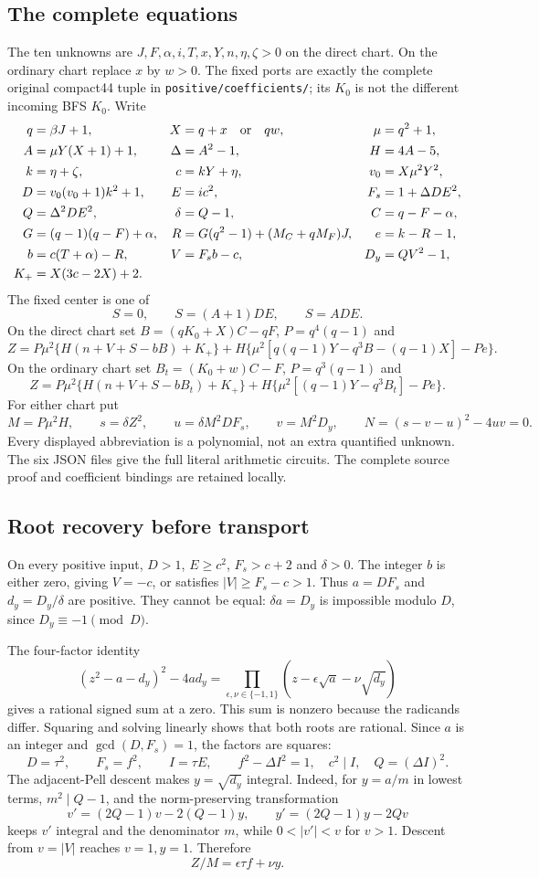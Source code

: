 \subsection{The complete equations}
The ten unknowns are $J,F,\alpha,i,T,x,Y,n,\eta,\zeta>0$ on the direct chart. On the ordinary chart replace $x$ by $w>0$. The fixed ports are exactly the complete original compact44 tuple in \texttt{positive/coefficients/}; its $K_0$ is not the different incoming BFS $K_0$. Write
\begin{align*}
q&=\beta J+1,&X&=q+x\quad\hbox{or}\quad qw,&\mu&=q^2+1,\\
A&=\mu Y(X+1)+1,&\Delta&=A^2-1,&H&=4A-5,\\
k&=\eta+\zeta,&c&=kY+\eta,&v_0&=X\mu^2Y^2,\\
D&=v_0(v_0+1)k^2+1,&E&=ic^2,&F_s&=1+\Delta DE^2,\\
Q&=\Delta^2DE^2,&\delta&=Q-1,&C&=q-F-\alpha,\\
G&=(q-1)(q-F)+\alpha,&R&=G(q^2-1)+(M_C+qM_F)J,&e&=k-R-1,\\
b&=c(T+\alpha)-R,&V&=F_sb-c,&D_y&=QV^2-1,\\
K_+&=X(3c-2X)+2.
\end{align*}
The fixed center is one of
\[
 S=0,\qquad S=(A+1)DE,\qquad S=ADE.
\]
On the direct chart set $B=(qK_0+X)C-qF$, $P=q^4(q-1)$ and
\[
 Z=P\mu^2\{H(n+V+S-bB)+K_+\}
 +H\{\mu^2[q(q-1)Y-q^3B-(q-1)X]-Pe\}.
\]
On the ordinary chart set $B_t=(K_0+w)C-F$, $P=q^3(q-1)$ and
\[
 Z=P\mu^2\{H(n+V+S-bB_t)+K_+\}
 +H\{\mu^2[(q-1)Y-q^3B_t]-Pe\}.
\]
For either chart put
\[
 M=P\mu^2H,\qquad s=\delta Z^2,\qquad
 u=\delta M^2DF_s,\qquad v=M^2D_y,
 \qquad \boxed{N=(s-v-u)^2-4uv=0.}
\]
Every displayed abbreviation is a polynomial, not an extra quantified unknown. The six JSON files give the full literal arithmetic circuits. The complete source proof and coefficient bindings are retained locally.

\subsection{Root recovery before transport}
On every positive input, $D>1$, $E\ge c^2$, $F_s>c+2$ and $\delta>0$. The integer $b$ is either zero, giving $V=-c$, or satisfies $|V|\ge F_s-c>1$. Thus $a=DF_s$ and $d_y=D_y/\delta$ are positive. They cannot be equal: $\delta a=D_y$ is impossible modulo $D$, since $D_y\equiv-1\pmod D$.

The four-factor identity
\[
 (z^2-a-d_y)^2-4ad_y
 =\prod_{\epsilon,\nu\in\{-1,1\}}
       (z-\epsilon\sqrt a-\nu\sqrt{d_y})
\]
gives a rational signed sum at a zero. This sum is nonzero because the radicands differ. Squaring and solving linearly shows that both roots are rational. Since $a$ is an integer and $\gcd(D,F_s)=1$, the factors are squares:
\[
 D=\tau^2,\qquad F_s=f^2,\qquad I=\tau E,
 \qquad f^2-\Delta I^2=1,\quad c^2\mid I,\quad Q=(\Delta I)^2.
\]
The adjacent-Pell descent makes $y=\sqrt{d_y}$ integral. Indeed, for $y=a/m$ in lowest terms, $m^2\mid Q-1$, and the norm-preserving transformation
\[
 v'=(2Q-1)v-2(Q-1)y,\qquad y'=(2Q-1)y-2Qv
\]
keeps $v'$ integral and the denominator $m$, while $0<|v'|<v$ for $v>1$. Descent from $v=|V|$ reaches $v=1,y=1$. Therefore
\[
 Z/M=\epsilon\tau f+\nu y. \tag{P1}
\]

